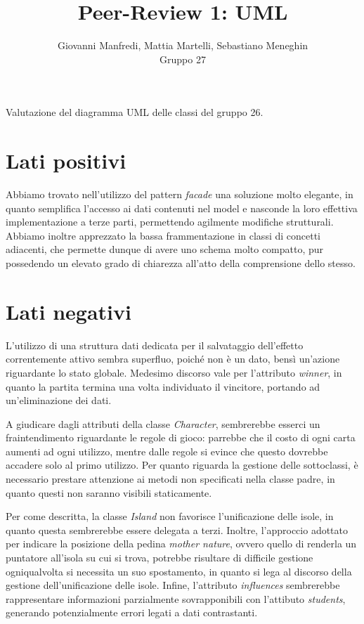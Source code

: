 \documentclass[12pt]{article}
\title{Peer-Review 1: UML}
\author{Giovanni Manfredi, Mattia Martelli, Sebastiano Meneghin\\Gruppo 27}
\begin{document}
\maketitle

Valutazione del diagramma UML delle classi del gruppo 26.

\section{Lati positivi}

Abbiamo trovato nell'utilizzo del pattern \emph{facade} una soluzione molto elegante, in quanto semplifica l'accesso ai dati contenuti nel model e nasconde
la loro effettiva implementazione a terze parti, permettendo agilmente modifiche strutturali. Abbiamo inoltre apprezzato la bassa frammentazione in classi di
concetti adiacenti, che permette dunque di avere uno schema molto compatto, pur possedendo un elevato grado di chiarezza all'atto della comprensione
dello stesso.

\section{Lati negativi}

L'utilizzo di una struttura dati dedicata per il salvataggio dell'effetto correntemente attivo sembra superfluo, poiché non è un dato, bensì un'azione
riguardante lo stato globale. Medesimo discorso vale per l'attributo \emph{winner}, in quanto la partita termina una volta individuato il vincitore,
portando ad un'eliminazione dei dati.

A giudicare dagli attributi della classe \emph{Character}, sembrerebbe esserci un fraintendimento riguardante le regole di gioco: parrebbe che il costo di
ogni carta aumenti ad ogni utilizzo, mentre dalle regole si evince che questo dovrebbe accadere solo al primo utilizzo. Per quanto riguarda la gestione
delle sottoclassi, è necessario prestare attenzione ai metodi non specificati nella classe padre, in quanto questi non saranno visibili staticamente.

Per come descritta, la classe \emph{Island} non favorisce l'unificazione delle isole, in quanto questa sembrerebbe essere delegata a terzi.  Inoltre,
l'approccio adottato per indicare la posizione della pedina \emph{mother nature}, ovvero quello di renderla un puntatore all'isola su cui si trova,
potrebbe risultare di difficile gestione ogniqualvolta si necessita un suo spostamento, in quanto si lega al discorso della gestione dell'unificazione
delle isole. Infine, l'attributo \emph{influences} sembrerebbe rappresentare informazioni parzialmente sovrapponibili con l'attibuto \emph{students},
generando potenzialmente errori legati a dati contrastanti.
\end{document}
